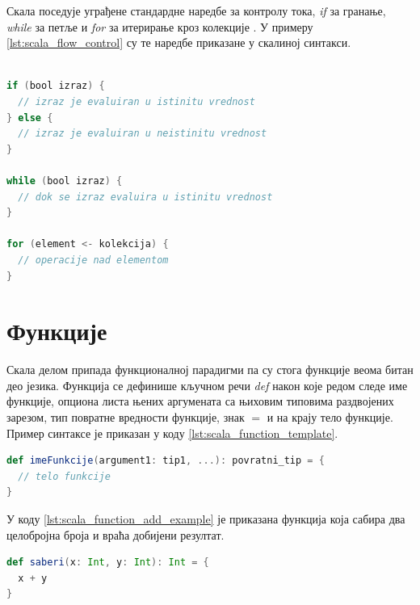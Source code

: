 \documentclass[12pt,oneside]{memoir}
\begin{document}
Скала поседује уграђене стандардне наредбе за контролу тока, \textit{if} за гранање, \textit{while} за петље и \textit{for} за итерирање кроз колекције \cite{scala_prog}. У примеру \ref{lst:scala_flow_control} су те наредбе приказане у скалиној синтакси.

\begin{lstlisting}[language=Scala, caption={Наредбе за контролу тока}, label={lst:scala_flow_control}]

if (bool izraz) {
  // izraz je evaluiran u istinitu vrednost
} else {
  // izraz je evaluiran u neistinitu vrednost
}

while (bool izraz) {
  // dok se izraz evaluira u istinitu vrednost
}

for (element <- kolekcija) {
  // operacije nad elementom
}

\end{lstlisting}



\section{Функције}
\label{sec:scala_funk}

Скала делом припада функционалној парадигми па су стога функције веома битан део језика. Функција се дефинише кључном речи \textit{def} након које редом следе име функције, опциона листа њених аргумената са њиховим типовима раздвојених зарезом, тип повратне вредности функције, знак $=$ и на крају тело функције. Пример синтаксе је приказан у коду \ref{lst:scala_function_template}.

\begin{lstlisting}[language=Scala, caption={Дефиниција функције у Скали}, label={lst:scala_function_template}, basicstyle=\small]
def imeFunkcije(argument1: tip1, ...): povratni_tip = {
  // telo funkcije
}

\end{lstlisting}

У коду \ref{lst:scala_function_add_example} је приказана функција која сабира два целобројна броја и враћа добијени резултат. 

\begin{lstlisting}[language=Scala, caption={Дефиниција функције која сабира два целобројна броја}, label={lst:scala_function_add_example}, basicstyle=\small]
def saberi(x: Int, y: Int): Int = {
  x + y
}
\end{lstlisting}
\end{document}
